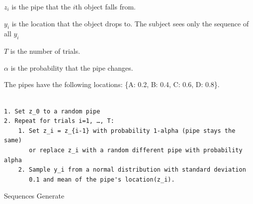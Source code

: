 \documentclass[12pt,letterpaper]{article}
\begin{document}
\begin{algorithm} [h!]
$z_i$ is the pipe that the $i$th object falls from.

$y_i$ is the location that the object drops to. The subject sees only the sequence of all $y_i$

$T$ is the number of trials.

$\alpha$ is the probability that the pipe changes.

The pipes have the following locations: \{A: 0.2, B: 0.4, C: 0.6, D: 0.8\}.

\begin{verbatim}
    
1. Set z_0 to a random pipe
2. Repeat for trials i=1, …, T:
    1. Set z_i = z_{i-1} with probability 1-alpha (pipe stays the same)
       or replace z_i with a random different pipe with probability alpha
    2. Sample y_i from a normal distribution with standard deviation
       0.1 and mean of the pipe's location(z_i).

\end{verbatim}

\caption{Sequences Generate}

\end{algorithm}
\end{document}
